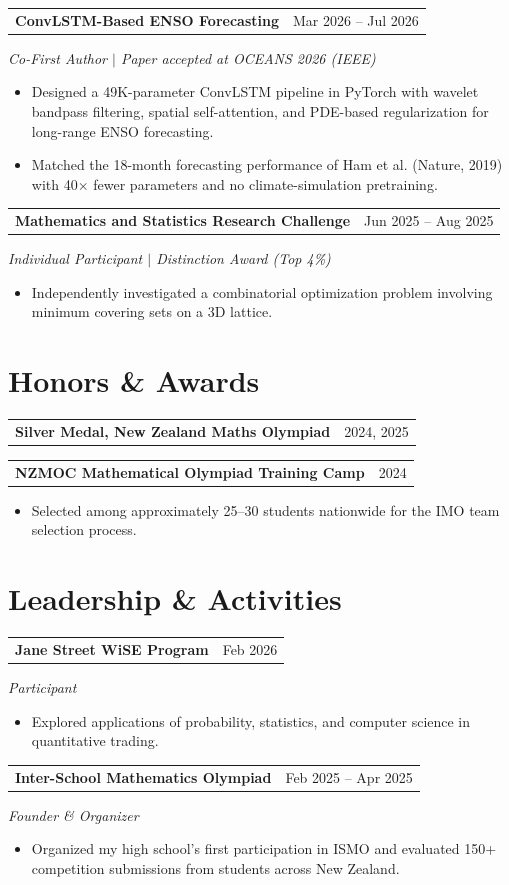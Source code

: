 \documentclass[10pt,letterpaper]{article}
\makeatletter
\newcommand{\entry}[2]{\noindent\begin{tabularx}{\textwidth}{@{}Xr@{}}\textbf{#1} & #2\\\end{tabularx}}
\makeatother
\begin{document}
\entry{ConvLSTM-Based ENSO Forecasting}{Mar 2026 -- Jul 2026}
\textit{Co-First Author $|$ Paper accepted at OCEANS 2026 (IEEE)}
\begin{itemize}
\item Designed a 49K-parameter ConvLSTM pipeline in PyTorch with wavelet bandpass filtering, spatial self-attention, and PDE-based regularization for long-range ENSO forecasting.
\item Matched the 18-month forecasting performance of Ham et al. (Nature, 2019) with 40$\times$ fewer parameters and no climate-simulation pretraining.
\end{itemize}
\vspace{7pt}

\entry{Mathematics and Statistics Research Challenge}{Jun 2025 -- Aug 2025}
\textit{Individual Participant $|$ Distinction Award (Top 4\%)}
\begin{itemize}
\item Independently investigated a combinatorial optimization problem involving minimum covering sets on a 3D lattice.
\end{itemize}

\section{Honors \& Awards}
\entry{Silver Medal, New Zealand Maths Olympiad}{2024, 2025}
\par\vspace{8pt}\noindent
\entry{NZMOC Mathematical Olympiad Training Camp}{2024}
\begin{itemize}
\item Selected among approximately 25--30 students nationwide for the IMO team selection process.
\end{itemize}

\section{Leadership \& Activities}
\entry{Jane Street WiSE Program}{Feb 2026}
\textit{Participant}
\begin{itemize}
\item Explored applications of probability, statistics, and computer science in quantitative trading.
\end{itemize}
\vspace{7pt}

\entry{Inter-School Mathematics Olympiad}{Feb 2025 -- Apr 2025}
\textit{Founder \& Organizer}
\begin{itemize}
\item Organized my high school's first participation in ISMO and evaluated 150+ competition submissions from students across New Zealand.
\end{itemize}
\end{document}
